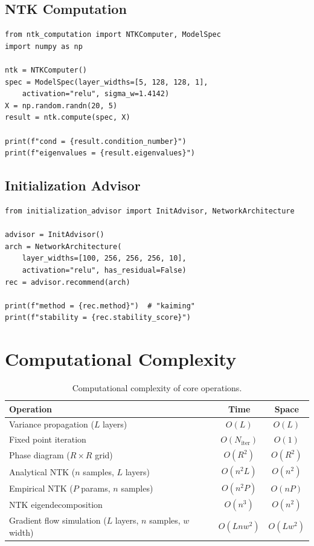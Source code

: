 \documentclass[10pt]{article}
\theoremstyle{definition}
\begin{document}
\subsection{NTK Computation}

\begin{lstlisting}
from ntk_computation import NTKComputer, ModelSpec
import numpy as np

ntk = NTKComputer()
spec = ModelSpec(layer_widths=[5, 128, 128, 1],
    activation="relu", sigma_w=1.4142)
X = np.random.randn(20, 5)
result = ntk.compute(spec, X)

print(f"cond = {result.condition_number}")
print(f"eigenvalues = {result.eigenvalues}")
\end{lstlisting}

\subsection{Initialization Advisor}

\begin{lstlisting}
from initialization_advisor import InitAdvisor, NetworkArchitecture

advisor = InitAdvisor()
arch = NetworkArchitecture(
    layer_widths=[100, 256, 256, 256, 10],
    activation="relu", has_residual=False)
rec = advisor.recommend(arch)

print(f"method = {rec.method}")  # "kaiming"
print(f"stability = {rec.stability_score}")
\end{lstlisting}

\section{Computational Complexity}
\label{app:complexity}

\begin{table}[H]
\centering
\caption{Computational complexity of core operations.}
\begin{tabular}{lcc}
\toprule
Operation & Time & Space \\
\midrule
Variance propagation ($L$ layers) & $O(L)$ & $O(L)$ \\
Fixed point iteration & $O(N_{\text{iter}})$ & $O(1)$ \\
Phase diagram ($R \times R$ grid) & $O(R^2)$ & $O(R^2)$ \\
Analytical NTK ($n$ samples, $L$ layers) & $O(n^2 L)$ & $O(n^2)$ \\
Empirical NTK ($P$ params, $n$ samples) & $O(n^2 P)$ & $O(nP)$ \\
NTK eigendecomposition & $O(n^3)$ & $O(n^2)$ \\
Gradient flow simulation ($L$ layers, $n$ samples, $w$ width) & $O(Lnw^2)$ & $O(Lw^2)$ \\
\bottomrule
\end{tabular}
\end{table}
\end{document}
